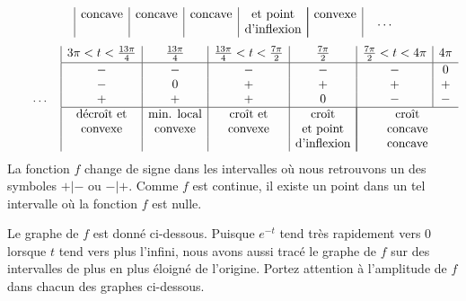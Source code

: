 {\[\begin{array}{|c|c|c|c|c|c|}
\text{concave} & \text{concave} & \text{concave} & \text{et point} &
\multicolumn{2}{|c|}{\text{convexe}} \\
 & & & \text{d'inflexion} & \multicolumn{2}{|c|}{}
\end{array} \quad \ldots
\]
\[
\qquad \ldots \quad
\begin{array}{|c|c|c|c|c|c}
\rule[-0.5em]{0em}{1em}
3\pi<t<\frac{13\pi}{4} & \frac{13\pi}{4} &
\frac{13\pi}{4}<t<\frac{7\pi}{2} & \frac{7\pi}{2} & \frac{7\pi}{2}<t<4\pi &
4\pi \\
\hline
- & - & - & - & - & 0 \\
- & 0 & + & + & + & + \\
+ & + & + & 0 & - & - \\
\hline
\text{décroît et} & \text{min. local} & \text{croît et} & \text{croît}
& \multicolumn{2}{|c}{\text{croît}} \\
\text{convexe} & \text{convexe} & \text{convexe} & \text{et point}
& \multicolumn{2}{|c}{\text{concave}} \\
 & & & \text{d'inflexion} & \multicolumn{2}{|c}{\text{concave}}
\end{array}
\]
La fonction $f$ change de signe dans les intervalles où nous retrouvons un des
symboles $+|-$ ou $-|+$.  Comme $f$ est continue, il existe un point dans
un tel intervalle où la fonction $f$ est nulle.

Le graphe de $f$ est donné ci-dessous.  Puisque $e^{-t}$ tend très
rapidement vers $0$ lorsque $t$ tend vers plus l'infini, nous avons aussi tracé
le graphe de $f$ sur des intervalles de plus en plus éloigné de l'origine.
Portez attention à l'amplitude de $f$ dans chacun des graphes
ci-dessous.
}


